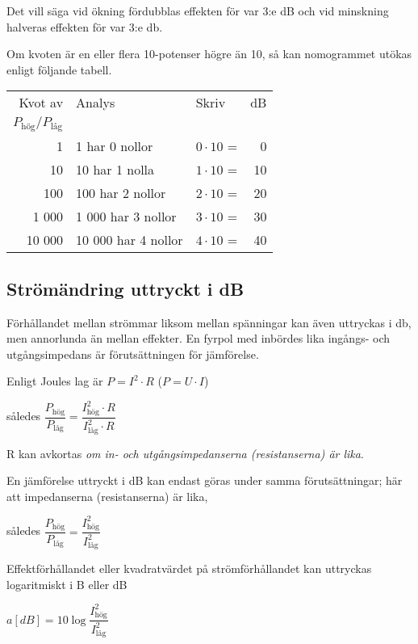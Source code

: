 Det vill säga vid ökning fördubblas effekten för var 3:e dB och vid minskning
halveras effekten för var 3:e \si{\decibel}.

Om kvoten är en eller flera 10-potenser högre än 10, så kan nomogrammet utökas
enligt följande tabell.

\begin{tabular}{rllr}
Kvot av & Analys             & Skriv            & dB \\
\(P_\text{hög}/P_\text{låg}\) &          &                  &    \\
     1 & 1 har 0 nollor      & \(0 \cdot 10\) = &  0 \\
    10 & 10 har 1 nolla      & \(1 \cdot 10\) = & 10 \\
   100 & 100 har 2 nollor    & \(2 \cdot 10\) = & 20 \\
 1 000 &  1 000 har 3 nollor & \(3 \cdot 10\) = & 30 \\
10 000 & 10 000 har 4 nollor & \(4 \cdot 10\) = & 40
\end{tabular}

\subsection{Strömändring uttryckt i dB}

Förhållandet mellan strömmar liksom mellan spänningar kan även uttryckas i
\si{\decibel}, men annorlunda än mellan effekter.
En fyrpol med inbördes lika ingångs- och utgångsimpedans är förutsättningen för
jämförelse.

Enligt Joules lag är \(P = I^2 \cdot R\) (\(P = U \cdot I\))

således \(\dfrac{P_\text{hög}}{P_\text{l{\aa}g}} = \dfrac{I_\text{hög}^2 \cdot R}{I_\text{l{\aa}g}^2 \cdot R}\)

R kan avkortas \emph{om in- och utgångsimpedanserna (resistanserna) är lika}.

En jämförelse uttryckt i dB kan endast göras under samma förutsättningar;
här att impedanserna (resistanserna) är lika,

således \(\dfrac{P_\text{hög}}{P_\text{låg}} = \dfrac{I_\text{hög}^2}{I_\text{låg}^2}\)

Effektförhållandet eller kvadratvärdet på strömförhållandet kan uttryckas
logaritmiskt i B eller dB

\(a[dB] = 10\log \dfrac{I_\text{hög}^2}{I_\text{låg}^2}\)

